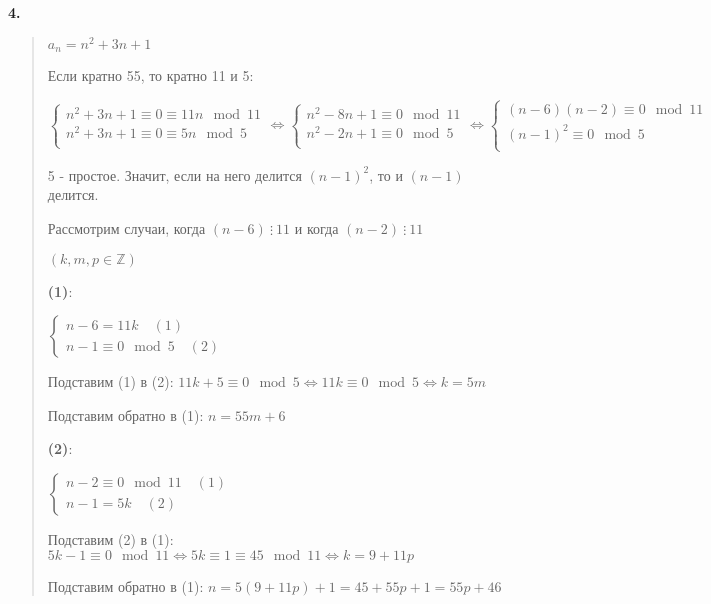 \documentclass{article}
\begin{document}
\textbf{\textsf{4.}}
\begin{quote}
$a_n = n^2 + 3n + 1$

Если кратно 55, то кратно 11 и 5:

$
\begin{cases}
n^2 + 3n + 1 \equiv 0 \equiv 11n \mod{11}\\
n^2 + 3n + 1 \equiv 0 \equiv 5n \mod{5}\\
\end{cases} \Leftrightarrow
\begin{cases}
n^2 -8n + 1 \equiv 0 \mod{11}\\
n^2 - 2n + 1 \equiv 0 \mod{5}\\
\end{cases}  \Leftrightarrow
\begin{cases}
(n - 6)(n - 2) \equiv 0 \mod{11}\\
(n - 1)^2 \equiv 0 \mod{5}\\
\end{cases}
$

5 - простое. Значит, если на него делится $(n - 1)^2$, то и $(n - 1)$ делится.

Рассмотрим случаи, когда $(n - 6) \ \vdots \ 11$ и когда $(n - 2) \ \vdots \ 11$

$(k, m, p \in \mathbb{Z})$

\textbf{(1)}: 

$
\begin{cases}
n - 6 = 11k \quad (1) \\
n - 1 \equiv 0 \mod 5 \quad (2)
\end{cases}
$

Подставим (1) в (2): $11 k + 5 \equiv 0 \mod{5} \Longleftrightarrow 11k \equiv 0 \mod{5} \Longleftrightarrow k = 5m$

Подставим обратно в (1): $n = 55m + 6$


\textbf{(2)}:

$
\begin{cases}
n - 2 \equiv 0 \mod{11} \quad (1) \\
n - 1 = 5k \quad (2)
\end{cases}
$

Подставим (2) в (1): $5k - 1 \equiv 0 \mod{11} \Longleftrightarrow 5k \equiv 1 \equiv 45 \mod{11} \Longleftrightarrow k = 9 + 11p$

Подставим обратно в (1): $n = 5(9 + 11p) + 1 = 45 + 55p + 1 = 55p + 46$

\end{quote}
\end{document}
